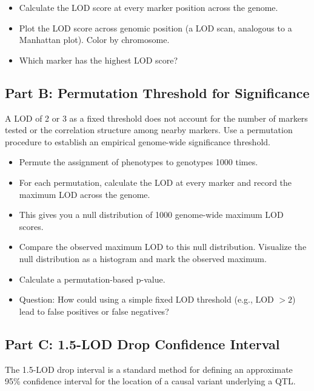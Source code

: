 \begin{dobox}[Tasks]
\begin{itemize}[nosep]
  \item Calculate the LOD score at every marker position across the genome.
  \item Plot the LOD score across genomic position (a LOD scan, analogous to a Manhattan plot). Color by chromosome.
  \item Which marker has the highest LOD score?
\end{itemize}
\end{dobox}

\subsection{Part B: Permutation Threshold for Significance}

A LOD of 2 or 3 as a fixed threshold does not account for the number of markers tested or the correlation structure among nearby markers. Use a permutation procedure to establish an empirical genome-wide significance threshold.

\begin{dobox}[Tasks]
\begin{itemize}[nosep]
  \item Permute the assignment of phenotypes to genotypes 1000 times.
  \item For each permutation, calculate the LOD at every marker and record the maximum LOD across the genome.
  \item This gives you a null distribution of 1000 genome-wide maximum LOD scores.
  \item Compare the observed maximum LOD to this null distribution. Visualize the null distribution as a histogram and mark the observed maximum.
  \item Calculate a permutation-based p-value.
  \item Question: How could using a simple fixed LOD threshold (e.g., LOD $> 2$) lead to false positives or false negatives?
\end{itemize}
\end{dobox}

\subsection{Part C: 1.5-LOD Drop Confidence Interval}

The 1.5-LOD drop interval is a standard method for defining an approximate 95\% confidence interval for the location of a causal variant underlying a QTL.

